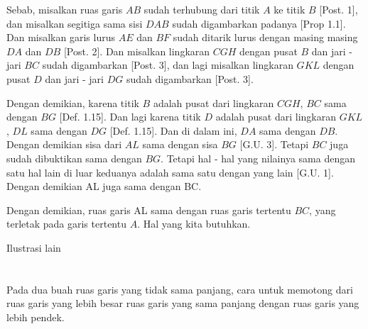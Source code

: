 \documentclass[a4paper]{book}
\begin{document}
Sebab, misalkan ruas garis $AB$ sudah terhubung dari titik $A$ ke titik $B$
[Post. 1], dan misalkan segitiga sama sisi $DAB$ sudah digambarkan 
padanya [Prop 1.1]. Dan misalkan garis lurus $AE$ dan $BF$ sudah 
ditarik lurus dengan masing masing $DA$ dan $DB$ [Post. 2]. Dan
misalkan lingkaran $CGH$ dengan pusat $B$ dan jari - jari $BC$ sudah 
digambarkan [Post. 3], dan lagi misalkan lingkaran $GKL$ dengan pusat $D$
dan jari - jari $DG$ sudah digambarkan [Post. 3].  

Dengan demikian, karena titik $B$ adalah pusat dari lingkaran $CGH$, $BC$ sama 
dengan $BG$ [Def. 1.15].  Dan lagi karena titik $D$ adalah pusat dari 
lingkaran $GKL$, $DL$ sama dengan $DG$ [Def. 1.15]. Dan di dalam ini, $DA$
sama dengan $DB$. Dengan demikian sisa dari $AL$ sama dengan sisa $BG$
[G.U. 3]. Tetapi $BC$ juga sudah dibuktikan sama dengan $BG$. Tetapi hal - hal
yang nilainya sama dengan satu hal lain di luar keduanya adalah sama satu 
dengan yang lain [G.U. 1]. Dengan demikian AL juga sama dengan BC.

Dengan demikian, ruas garis AL sama dengan ruas garis tertentu
$BC$, yang terletak pada garis tertentu $A$. Hal yang kita butuhkan.  

Ilustrasi lain
\begin{center}
\end{center}

\section*{\centering \thesection} 

Pada dua buah ruas garis yang tidak sama panjang, cara untuk
memotong dari ruas garis yang lebih besar ruas garis yang sama panjang dengan
ruas garis yang lebih pendek.
\end{document}
